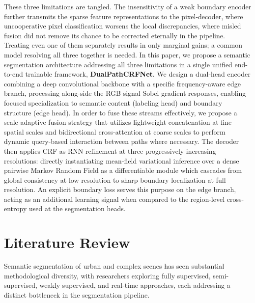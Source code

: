\documentclass[conference]{IEEEtran}
\begin{document}
These three limitations are tangled. The insensitivity of a weak boundary encoder further transmits the
sparse feature representations to the pixel-decoder, where uncooperative pixel classification worsens the
local discrepancies, where misled fusion did not remove its chance to be corrected eternally in the pipeline.
Treating even one of them separately results in only marginal gains; a common model resolving all three
together is needed. In this paper, we propose a semantic segmentation architecture addressing all three
limitations in a single unified end-to-end trainable framework, \textbf{DualPathCRFNet}. We design a dual-head
encoder combining a deep convolutional backbone with a specific frequency-aware edge branch,
processing along-side the RGB signal Sobel gradient responses, enabling focused specialization to
semantic content (labeling head) and boundary structure (edge head). In order to fuse these streams
effectively, we propose a scale adaptive fusion strategy that utilizes lightweight concatenation at fine
spatial scales and bidirectional cross-attention at coarse scales to perform dynamic query-based interaction
between paths where necessary. The decoder then applies CRF-as-RNN refinement at three progressively
increasing resolutions: directly instantiating mean-field variational inference over a dense pairwise
Markov Random Field as a differentiable module which cascades from global consistency at low
resolution to sharp boundary localization at full resolution. An explicit boundary loss serves this purpose
on the edge branch, acting as an additional learning signal when compared to the region-level cross-entropy used at the segmentation heads.

 
\section{Literature Review}\label{sec:lit}

Semantic segmentation of urban and complex scenes has seen substantial methodological diversity, with
researchers exploring fully supervised, semi-supervised, weakly supervised, and real-time approaches,
each addressing a distinct bottleneck in the segmentation pipeline.
\end{document}
